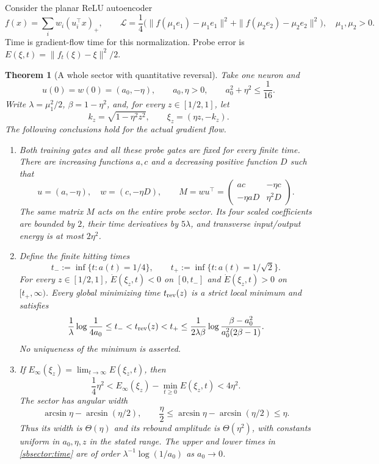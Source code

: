 \documentclass{article} %
\theoremstyle{plain}
\newtheorem{theorem}{Theorem}[section]
\theoremstyle{definition}
\theoremstyle{remark}
\begin{document}
Consider the planar ReLU autoencoder
\[
 f(x)=\sum_i w_i(u_i^\top x)_+,\qquad
 \mathcal L=\frac14\bigl(\|f(\mu_1e_1)-\mu_1e_1\|^2
                         +\|f(\mu_2e_2)-\mu_2e_2\|^2\bigr),
 \quad \mu_1,\mu_2>0.
\]
Time is gradient-flow time for this normalization. Probe error is
$E(\xi,t)=\|f_t(\xi)-\xi\|^2/2$.

\begin{theorem}[A whole sector with quantitative reversal]
\label{sbsector:theorem}
Take one neuron and
\[
 u(0)=w(0)=(a_0,-\eta),\qquad
 a_0,\eta>0,\qquad a_0^2+\eta^2\le\frac1{16}.
\]
Write $\lambda=\mu_1^2/2$, $\beta=1-\eta^2$, and, for every
$z\in[1/2,1]$, let
\[
 k_z=\sqrt{1-\eta^2z^2},\qquad \xi_z=(\eta z,-k_z).
\]
The following conclusions hold for the actual gradient flow.
\begin{enumerate}[label=(\roman*)]
\item Both training gates and all these probe gates are fixed for every
finite time. There are increasing functions $a,c$ and a decreasing
positive function $D$ such that
\[
 u=(a,-\eta),\quad w=(c,-\eta D),\qquad
 M=wu^\top=
 \begin{pmatrix}ac&-\eta c\\-\eta aD&\eta^2D\end{pmatrix}.
\]
The same matrix $M$ acts on the entire probe sector. Its four scaled
coefficients are bounded by $2$, their time derivatives by $5\lambda$,
and transverse input/output energy is at most $2\eta^2$.

\item Define the finite hitting times
\[
 t_-:=\inf\{t:a(t)=1/4\},\qquad
 t_+:=\inf\{t:a(t)=1/\sqrt2\}.
\]
For every $z\in[1/2,1]$, $\dot E(\xi_z,t)<0$ on $[0,t_-]$ and
$\dot E(\xi_z,t)>0$ on $[t_+,\infty)$. Every global minimizing time
$t_{\rm rev}(z)$ is a strict local minimum and satisfies
\begin{equation}\label{sbsector:time}
 \frac1\lambda\log\frac1{4a_0}
 \le t_-<t_{\rm rev}(z)<t_+
 \le\frac1{2\lambda\beta}
 \log\frac{\beta-a_0^2}{a_0^2(2\beta-1)}.
\end{equation}
No uniqueness of the minimum is asserted.

\item If $E_\infty(\xi_z)=\lim_{t\to\infty}E(\xi_z,t)$, then
\begin{equation}\label{sbsector:amplitude}
 \frac14\eta^2
 < E_\infty(\xi_z)-\min_{t\ge0}E(\xi_z,t)
 <4\eta^2.
\end{equation}
The sector has angular width
\[
 \arcsin\eta-\arcsin(\eta/2),\qquad
 \frac\eta2\le\arcsin\eta-\arcsin(\eta/2)\le\eta.
\]
Thus its width is $\Theta(\eta)$ and its rebound amplitude is
$\Theta(\eta^2)$, with constants uniform in $a_0,\eta,z$ in the stated
range. The upper and lower times in \eqref{sbsector:time} are of order
$\lambda^{-1}\log(1/a_0)$ as $a_0\to0$.
\end{enumerate}
\end{theorem}
\end{document}
